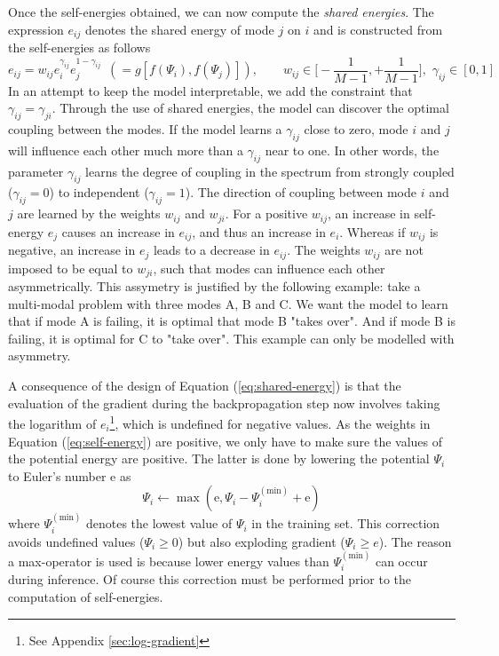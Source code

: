Once the self-energies obtained, we can now compute the \textit{shared energies}. The expression $e_{ij}$ denotes the shared energy of mode $j$ on $i$ and is constructed from the self-energies as follows
\begin{equation}
e_{ij} = w_{ij}e_i^{\gamma_{ij}}e_j^{1-\gamma_{ij}}\,\,\, (=g[f(\Psi_i), f(\Psi_j)]), \qquad w_{ij} \in \bigg[-\frac{1}{M-1}, +\frac{1}{M-1}\bigg],\,\, \gamma_{ij} \in [0,1]
\label{eq:shared-energy}
\end{equation}
In an attempt to keep the model interpretable, we add the constraint that $\gamma_{ij} = \gamma_{ji}$. Through the use of shared energies, the model can discover the optimal coupling between the modes. If the model learns a $\gamma_{ij}$ close to zero, mode $i$ and $j$ will influence each other much more than a $\gamma_{ij}$ near to one. In other words, the parameter $\gamma_{ij}$ learns the degree of coupling in the spectrum from strongly coupled ($\gamma_{ij}=0$) to independent ($\gamma_{ij} = 1$). The direction of coupling between mode $i$ and $j$ are learned by the weights $w_{ij}$ and $w_{ji}$. For a positive $w_{ij}$, an increase in self-energy $e_j$ causes an increase in $e_{ij}$, and thus an increase in $e_i$. Whereas if $w_{ij}$ is negative, an increase in $e_j$ leads to a decrease in $e_{ij}$. The weights $w_{ij}$ are not imposed to be equal to $w_{ji}$, such that modes can influence each other asymmetrically. This assymetry is justified by the following example: take a multi-modal problem with three modes A, B and C. We want the model to learn that if mode A is failing, it is optimal that mode B "takes over". And if mode B is failing, it is optimal for C to "take over". This example can only be modelled with asymmetry.

A consequence of the design of Equation (\ref{eq:shared-energy}) is that the evaluation of the gradient during the backpropagation step now involves taking the logarithm of $e_i$\footnote{See Appendix \ref{sec:log-gradient}}, which is undefined for negative values. As the weights in Equation (\ref{eq:self-energy}) are positive, we only have to make sure the values of the potential energy are positive. The latter is done by lowering the potential $\Psi_i$ to Euler's number $\mathrm{e}$ as
\begin{equation}
\Psi_i \leftarrow \max(\mathrm{e}, \Psi_i - \Psi_i^{(\text{min})} + \mathrm{e})
\end{equation}
where $\Psi_i^{(\text{min})}$ denotes the lowest value of $\Psi_i$ in the training set. This correction avoids undefined values ($\Psi_i \geq 0$) but also exploding gradient ($\Psi_i \geq e$). The reason a max-operator is used is because lower energy values than $\Psi_i^{(\text{min})}$  can occur during inference. Of course this correction must be performed prior to the computation of self-energies.


